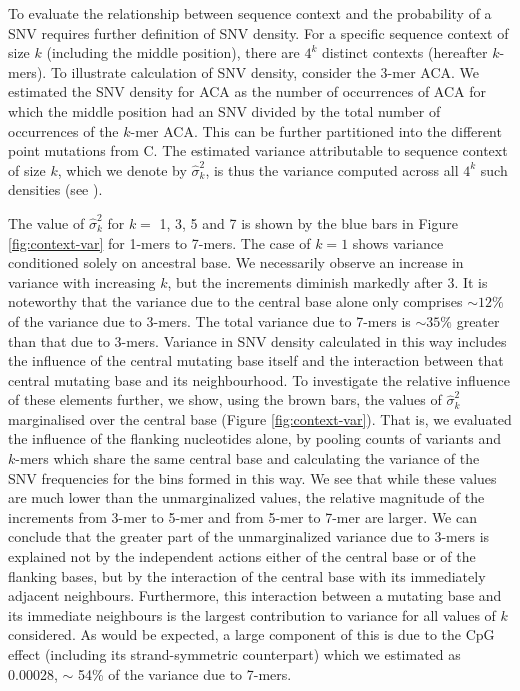 To evaluate the relationship between sequence context and the probability of a SNV requires further definition of SNV density. For a specific sequence context of size $k$ (including the middle position), there are $4^k$ distinct contexts (hereafter $k$-mers). To illustrate calculation of SNV density, consider the 3-mer ACA. We estimated the SNV density for ACA as the number of occurrences of ACA for which the middle position had an SNV divided by the total number of occurrences of the $k$-mer ACA. This can be further partitioned into the different point mutations from C. The estimated variance attributable to sequence context of size $k$, which we denote by $\hat{\sigma }^2_k$, is thus the variance computed across all $4^k$ such densities (see ).

The value of $\hat{\sigma }^2_k$ for $k=$ 1, 3, 5 and 7 is shown by the blue bars in Figure \ref{fig:context-var} for 1-mers to 7-mers. The case of $k=1$ shows variance conditioned solely on ancestral base. We necessarily observe an increase in variance with increasing $k$, but the increments diminish markedly after 3. It is noteworthy that the variance due to the central base alone only comprises $\sim12\%$ of the variance due to 3-mers. The total variance due to 7-mers is $\sim35\%$ greater than that due to 3-mers. Variance in SNV density calculated in this way includes the influence of the central mutating base itself and the interaction between that central mutating base and its neighbourhood. To investigate the relative influence of these elements further, we show, using the brown bars, the values of $\hat{\sigma }^2_k$ marginalised over the central base (Figure \ref{fig:context-var}). That is, we evaluated the influence of the flanking nucleotides alone, by pooling counts of variants and $k$-mers which share the same central base and calculating the variance of the SNV frequencies for the bins formed in this way. We see that while these values are much lower than the unmarginalized values, the relative magnitude of the increments from 3-mer to 5-mer and from 5-mer to 7-mer are larger. We can conclude that the greater part of the unmarginalized variance due to 3-mers is explained not by the independent actions either of the central base or of the flanking bases, but by the interaction of the central base with its immediately adjacent neighbours. Furthermore, this interaction between a mutating base and its immediate neighbours is the largest contribution to variance for all values of $k$ considered. As would be expected,  a large component of this is due to the CpG effect (including its strand-symmetric counterpart) which we estimated as 0.00028, $\sim$ 54\% of the variance due to 7-mers.

